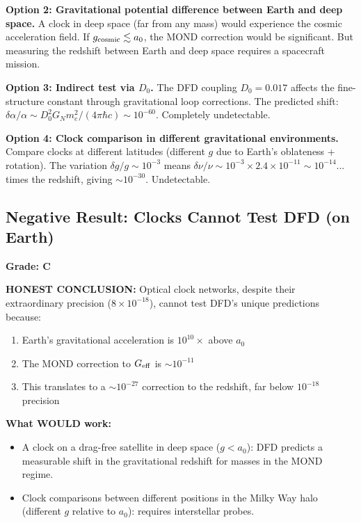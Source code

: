 \documentclass[11pt,a4paper]{article}
\begin{document}
\textbf{Option 2: Gravitational potential difference between Earth and deep space.}
A clock in deep space (far from any mass) would experience the cosmic acceleration field. If $g_{\rm cosmic} \lesssim a_0$, the MOND correction would be significant. But measuring the redshift between Earth and deep space requires a spacecraft mission.

\textbf{Option 3: Indirect test via $D_0$.}
The DFD coupling $D_0 = 0.017$ affects the fine-structure constant through gravitational loop corrections. The predicted shift: $\delta\alpha/\alpha \sim D_0^2 G_N m_e^2/(4\pi\hbar c) \sim 10^{-60}$. Completely undetectable.

\textbf{Option 4: Clock comparison in different gravitational environments.}
Compare clocks at different latitudes (different $g$ due to Earth's oblateness + rotation). The variation $\delta g/g \sim 10^{-3}$ means $\delta\nu/\nu \sim 10^{-3}\times2.4\times10^{-11} \sim 10^{-14}$... times the redshift, giving $\sim 10^{-30}$. Undetectable.

\subsection{Negative Result: Clocks Cannot Test DFD (on Earth)}

\textbf{Grade: C}

\textbf{HONEST CONCLUSION:} Optical clock networks, despite their extraordinary precision ($8\times10^{-18}$), cannot test DFD's unique predictions because:
\begin{enumerate}
\item Earth's gravitational acceleration is $10^{10}\times$ above $a_0$
\item The MOND correction to $G_{\rm eff}$ is $\sim 10^{-11}$
\item This translates to a $\sim 10^{-27}$ correction to the redshift, far below $10^{-18}$ precision
\end{enumerate}

\textbf{What WOULD work:}
\begin{itemize}
\item A clock on a drag-free satellite in deep space ($g < a_0$): DFD predicts a measurable shift in the gravitational redshift for masses in the MOND regime.
\item Clock comparisons between different positions in the Milky Way halo (different $g$ relative to $a_0$): requires interstellar probes.
\end{itemize}
\end{document}

